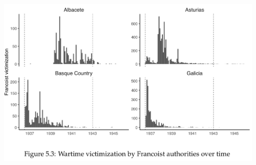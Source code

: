 \documentclass[utf8, xcolor=dvipsnames, handout]{beamer}
\begin{document}
\begin{frame}
\begin{minipage}{0.4\textwidth}
  \includegraphics[width = \textwidth]{img/dissplot_time}
\end{minipage}

\end{frame}
\end{document}
